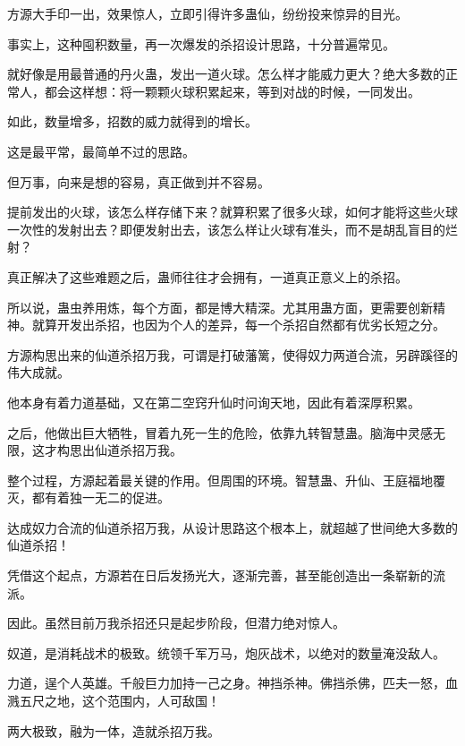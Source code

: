 
\begin{this_body}



方源大手印一出，效果惊人，立即引得许多蛊仙，纷纷投来惊异的目光。

事实上，这种囤积数量，再一次爆发的杀招设计思路，十分普遍常见。

就好像是用最普通的丹火蛊，发出一道火球。怎么样才能威力更大？绝大多数的正常人，都会这样想：将一颗颗火球积累起来，等到对战的时候，一同发出。

如此，数量增多，招数的威力就得到的增长。

这是最平常，最简单不过的思路。

但万事，向来是想的容易，真正做到并不容易。

提前发出的火球，该怎么样存储下来？就算积累了很多火球，如何才能将这些火球一次性的发射出去？即便发射出去，该怎么样让火球有准头，而不是胡乱盲目的烂射？

真正解决了这些难题之后，蛊师往往才会拥有，一道真正意义上的杀招。

所以说，蛊虫养用炼，每个方面，都是博大精深。尤其用蛊方面，更需要创新精神。就算开发出杀招，也因为个人的差异，每一个杀招自然都有优劣长短之分。

方源构思出来的仙道杀招万我，可谓是打破藩篱，使得奴力两道合流，另辟蹊径的伟大成就。

他本身有着力道基础，又在第二空窍升仙时问询天地，因此有着深厚积累。

之后，他做出巨大牺牲，冒着九死一生的危险，依靠九转智慧蛊。脑海中灵感无限，这才构思出仙道杀招万我。

整个过程，方源起着最关键的作用。但周围的环境。智慧蛊、升仙、王庭福地覆灭，都有着独一无二的促进。

达成奴力合流的仙道杀招万我，从设计思路这个根本上，就超越了世间绝大多数的仙道杀招！

凭借这个起点，方源若在日后发扬光大，逐渐完善，甚至能创造出一条崭新的流派。

因此。虽然目前万我杀招还只是起步阶段，但潜力绝对惊人。

奴道，是消耗战术的极致。统领千军万马，炮灰战术，以绝对的数量淹没敌人。

力道，逞个人英雄。千般巨力加持一己之身。神挡杀神。佛挡杀佛，匹夫一怒，血溅五尺之地，这个范围内，人可敌国！

两大极致，融为一体，造就杀招万我。


\end{this_body}

